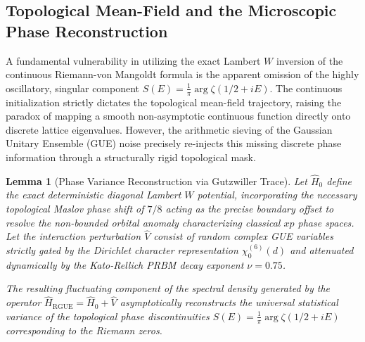 \documentclass[aps,prl,preprint,superscriptaddress,floatfix]{revtex4-2}
\newtheorem{lemma}[theorem]{Lemma}
\begin{document}
\subsection{Topological Mean-Field and the Microscopic Phase Reconstruction}

A fundamental vulnerability in utilizing the exact Lambert $W$ inversion of the continuous Riemann-von Mangoldt formula is the apparent omission of the highly oscillatory, singular component $S(E) = \frac{1}{\pi} \arg \zeta(1/2+iE)$. The continuous initialization strictly dictates the topological mean-field trajectory, raising the paradox of mapping a smooth non-asymptotic continuous function directly onto discrete lattice eigenvalues. However, the arithmetic sieving of the Gaussian Unitary Ensemble (GUE) noise precisely re-injects this missing discrete phase information through a structurally rigid topological mask.

\begin{lemma}[Phase Variance Reconstruction via Gutzwiller Trace]
\label{lemma:phase_absorption_formal_gutzwiller}
Let $\hat{H}_0$ define the exact deterministic diagonal Lambert $W$ potential, incorporating the necessary topological Maslov phase shift of $7/8$ acting as the precise boundary offset to resolve the non-bounded orbital anomaly characterizing classical $xp$ phase spaces. Let the interaction perturbation $\hat{V}$ consist of random complex GUE variables strictly gated by the Dirichlet character representation $\chi_0^{(6)}(d)$ and attenuated dynamically by the Kato-Rellich PRBM decay exponent $\nu = 0.75$.

The resulting fluctuating component of the spectral density generated by the operator $\hat{H}_{\text{RGUE}} = \hat{H}_0 + \hat{V}$ asymptotically reconstructs the universal statistical variance of the topological phase discontinuities $S(E) = \frac{1}{\pi} \arg \zeta(1/2+iE)$ corresponding to the Riemann zeros.
\end{lemma}

\end{document}
